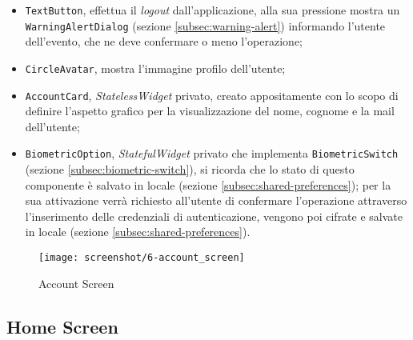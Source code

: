 \begin{itemize}
    \item \lstinline{TextButton}\cite{site:text-button}, effettua il \emph{logout} dall'applicazione, alla sua pressione mostra un \lstinline{WarningAlertDialog} (sezione \ref{subsec:warning-alert}) informando l'utente dell'evento, che ne deve confermare o meno l'operazione;
    \item \lstinline{CircleAvatar}\cite{site:circle-avatar}, mostra l'immagine profilo dell'utente;
    \item \lstinline{AccountCard}, \emph{StatelessWidget} privato, creato appositamente con lo scopo di definire l'aspetto grafico per la visualizzazione del nome, cognome e la mail dell'utente;
    \item \lstinline{BiometricOption}, \emph{StatefulWidget} privato che implementa \lstinline{BiometricSwitch} (sezione \ref{subsec:biometric-switch}), si ricorda che lo stato di questo componente è salvato in locale (sezione \ref{subsec:shared-preferences}); per la sua attivazione verrà richiesto all'utente di confermare l'operazione attraverso l'inserimento delle credenziali di autenticazione, vengono poi cifrate e salvate in locale (sezione \ref{subsec:shared-preferences}).
\end{itemize}

\begin{figure}[!h] 
    \centering 
    \texttt{[image: screenshot/6-account\_screen]} 
    \caption{Account Screen}
    \label{fig:account-screen}
\end{figure}

\subsection{Home Screen}
\label{subsec:home-screen}

